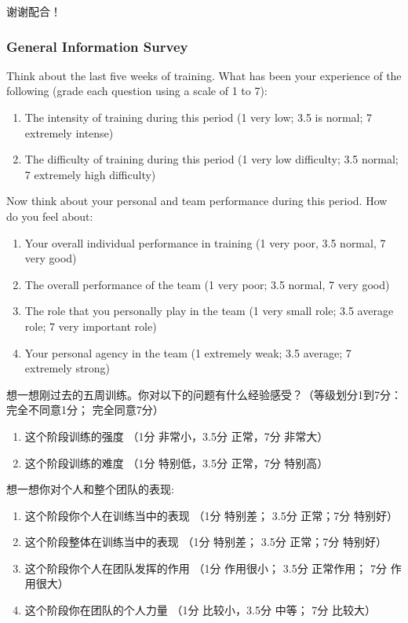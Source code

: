 \begin{CJK}{UTF8}{gbsn}
    谢谢配合！





        \subsubsection{General Information Survey \label{sect:generalSurvey}}


  Think about the last five weeks of training.  What has been your experience of the following (grade each question using a scale of 1 to 7):

\begin{enumerate}
  \item The intensity of training during this period (1 very low; 3.5 is normal; 7 extremely intense)
  \item The difficulty of training during this period (1 very low difficulty; 3.5 normal; 7 extremely high difficulty)
\end{enumerate}

Now think about your personal and team performance during this period.  How do you feel about:

\begin{enumerate}
  \item Your overall individual performance in training (1 very poor, 3.5 normal, 7 very good)
  \item The overall performance of the team (1 very poor; 3.5 normal, 7 very good)
  \item The role that you personally play in the team (1 very small role; 3.5 average role; 7 very important role)
  \item  Your personal agency in the team (1 extremely weak;  3.5 average; 7 extremely strong)
\end{enumerate}


想一想刚过去的五周训练。你对以下的问题有什么经验感受？（等级划分1到7分：完全不同意1分； 完全同意7分）
\begin{enumerate}
  \item 这个阶段训练的强度 （1分 非常小，3.5分 正常，7分 非常大）
  \item 这个阶段训练的难度 （1分 特别低，3.5分 正常，7分 特别高）
\end{enumerate}

想一想你对个人和整个团队的表现:

\begin{enumerate}
  \item 这个阶段你个人在训练当中的表现 （1分 特别差； 3.5分 正常；7分 特别好）
  \item 这个阶段整体在训练当中的表现 （1分 特别差； 3.5分 正常；7分 特别好）
  \item 这个阶段你个人在团队发挥的作用 （1分 作用很小； 3.5分 正常作用； 7分 作用很大）
  \item 这个阶段你在团队的个人力量 （1分 比较小，3.5分 中等； 7分 比较大）
\end{enumerate}






                                                        \end{CJK}
